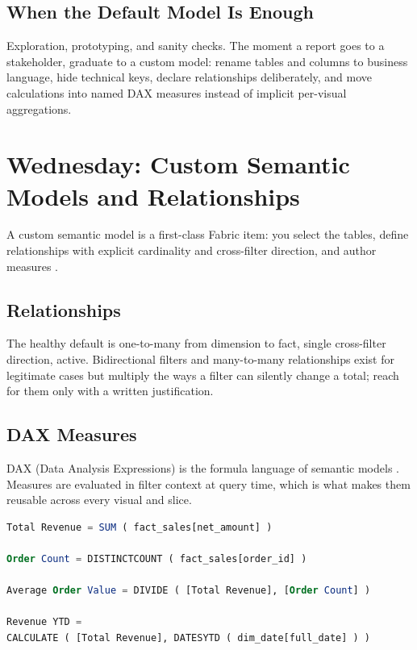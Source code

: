 \subsection{When the Default Model Is Enough}
Exploration, prototyping, and sanity checks. The moment a report goes to a stakeholder, graduate to a custom model: rename tables and columns to business language, hide technical keys, declare relationships deliberately, and move calculations into named DAX measures instead of implicit per-visual aggregations.

\section{Wednesday: Custom Semantic Models and Relationships}
A custom semantic model is a first-class Fabric item: you select the tables, define relationships with explicit cardinality and cross-filter direction, and author measures \cite{microsoftFabricSemanticModels,microsoftDax}.

\subsection{Relationships}
The healthy default is one-to-many from dimension to fact, single cross-filter direction, active. Bidirectional filters and many-to-many relationships exist for legitimate cases but multiply the ways a filter can silently change a total; reach for them only with a written justification.

\subsection{DAX Measures}
DAX (Data Analysis Expressions) is the formula language of semantic models \cite{microsoftDax}. Measures are evaluated in filter context at query time, which is what makes them reusable across every visual and slice.

\begin{lstlisting}[language=SQL,caption={Foundational DAX measures over the star schema.},label={lst:chapter7-dax}]
Total Revenue = SUM ( fact_sales[net_amount] )

Order Count = DISTINCTCOUNT ( fact_sales[order_id] )

Average Order Value = DIVIDE ( [Total Revenue], [Order Count] )

Revenue YTD =
CALCULATE ( [Total Revenue], DATESYTD ( dim_date[full_date] ) )
\end{lstlisting}

